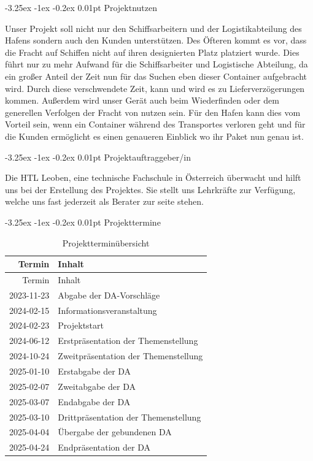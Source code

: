 \documentclass[
    headings=optiontotocandhead,%
    twoside,
    numbers=noenddot,%
    12pt, %
    titlepage, %
    parskip=full, %
    listof=leveldown, 
    numbers=noenddot, %
    a4paper,DIV=14,
    BCOR=15mm,
]{scrbook}
\makeatletter
\renewcommand\paragraph{\@startsection{paragraph}{4}{\z@}%
    {-3.25ex \@plus -1ex \@minus -0.2ex}%
    {0.01pt}%
    {\raggedsection\normalfont\sectfont\nobreak\size@paragraph}%
  }
\makeatother
\begin{document}
\hypertarget{projektnutzen}{%
\paragraph{Projektnutzen}\label{projektnutzen}}

Unser Projekt soll nicht nur den Schiffsarbeitern und der
Logistikabteilung des Hafens sondern auch den Kunden unterstützen. Des
Öfteren kommt es vor, dass die Fracht auf Schiffen nicht auf ihren
designierten Platz platziert wurde. Dies führt nur zu mehr Aufwand für
die Schiffsarbeiter und Logistische Abteilung, da ein großer Anteil der
Zeit nun für das Suchen eben dieser Container aufgebracht wird. Durch
diese verschwendete Zeit, kann und wird es zu Lieferverzögerungen
kommen. Außerdem wird unser Gerät auch beim Wiederfinden oder dem
generellen Verfolgen der Fracht von nutzen sein. Für den Hafen kann dies
vom Vorteil sein, wenn ein Container während des Transportes verloren
geht und für die Kunden ermöglicht es einen genaueren Einblick wo ihr
Paket nun genau ist.

\hypertarget{projektauftraggeberin}{%
\paragraph{Projektauftraggeber/in}\label{projektauftraggeberin}}

Die HTL Leoben, eine technische Fachschule in Österreich überwacht und
hilft uns bei der Erstellung des Projektes. Sie stellt uns Lehrkräfte
zur Verfügung, welche uns fast jederzeit als Berater zur seite stehen.

\hypertarget{projekttermine}{%
\paragraph{Projekttermine}\label{projekttermine}}

\begin{longtable}[]{@{}rl@{}}
\caption{Projektterminübersicht}\tabularnewline
\toprule
Termin & Inhalt\tabularnewline
\midrule
\endfirsthead
\toprule
Termin & Inhalt\tabularnewline
\midrule
\endhead
2023-11-23 & Abgabe der DA-Vorschläge\tabularnewline
2024-02-15 & Informationsveranstaltung\tabularnewline
2024-02-23 & Projektstart\tabularnewline
2024-06-12 & Erstpräsentation der Themenstellung\tabularnewline
2024-10-24 & Zweitpräsentation der Themenstellung\tabularnewline
2025-01-10 & Erstabgabe der DA\tabularnewline
2025-02-07 & Zweitabgabe der DA\tabularnewline
2025-03-07 & Endabgabe der DA\tabularnewline
2025-03-10 & Drittpräsentation der Themenstellung\tabularnewline
2025-04-04 & Übergabe der gebundenen DA\tabularnewline
2025-04-24 & Endpräsentation der DA\tabularnewline
\bottomrule
\end{longtable}
\end{document}
